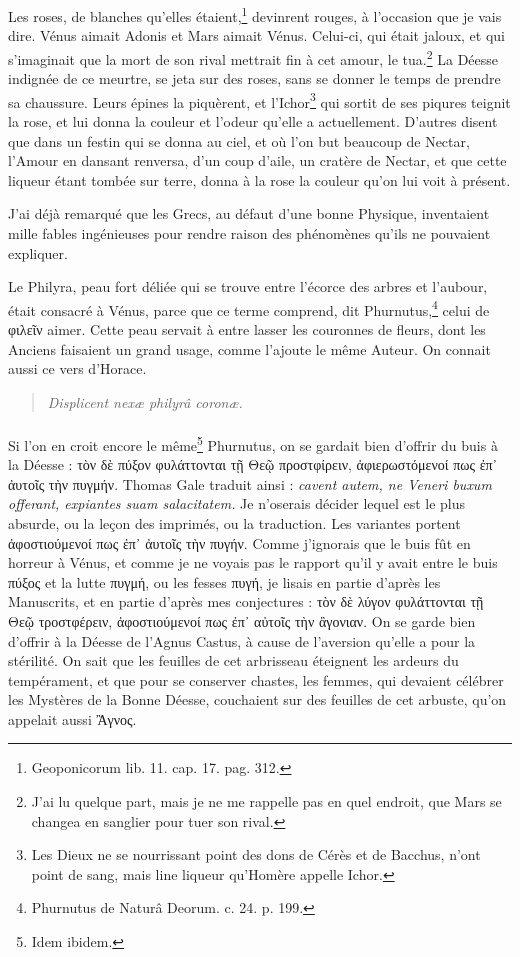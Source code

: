 \documentclass[a4paper, 18pt, oneside]{article}
\begin{document}
Les roses, de blanches qu'elles étaient,\footnote{Geoponicorum lib. 11. cap. 17. pag. 312.} devinrent rouges, à l'occasion que je vais dire. Vénus aimait Adonis et Mars aimait Vénus. Celui-ci, qui était jaloux, et qui s'imaginait que la mort de son rival mettrait fin à cet amour, le tua.\footnote{J'ai lu quelque part, mais je ne me rappelle pas en quel endroit, que Mars se changea en sanglier pour tuer son rival.} La Déesse indignée de ce meurtre, se jeta sur des roses, sans se donner le temps de prendre sa chaussure. Leurs épines la piquèrent, et l'Ichor\footnote{Les Dieux ne se nourrissant point des dons de Cérès et de Bacchus, n'ont point de sang, mais line liqueur qu'Homère appelle Ichor.} qui sortit de ses piqures teignit la rose, et lui donna la couleur et l'odeur qu'elle a actuellement. D'autres disent que dans un festin qui se donna au ciel, et où l'on but beaucoup de Nectar, l'Amour en dansant renversa, d'un coup d'aile, un cratère de Nectar, et que cette liqueur étant tombée sur terre, donna à la rose la couleur qu'on lui voit à présent.

J'ai déjà remarqué que les Grecs, au défaut d'une bonne Physique, inventaient mille fables ingénieuses pour rendre raison des phénomènes qu'ils ne pouvaient expliquer.

Le Philyra, peau fort déliée qui se trouve entre l'écorce des arbres et l'aubour, était consacré à Vénus, parce que ce terme comprend, dit Phurnutus,\footnote{Phurnutus de Naturâ Deorum. c. 24. p. 199.} celui de φιλεῖν aimer. Cette peau servait à entre lasser les couronnes de fleurs, dont les Anciens faisaient un grand usage, comme l'ajoute le même Auteur. On connait aussi ce vers d'Horace.
\begin{quotation}
\emph{Displicent nexæ philyrâ coronæ.}
\end{quotation}
\paragraph{}
Si l'on en croit encore le même\footnote{Idem ibidem.} Phurnutus, on se gardait bien d'offrir du buis à la Déesse : τὸν δὲ πύξον φυλάττονται τῇ Θεῷ προστφίρειν, ἀφιερωστόμενοί πως ἐπ᾽ ἀυτοῖς τὴν πυγμήν. Thomas Gale traduit ainsi : \emph{cavent autem, ne Veneri buxum offerant, expiantes suam salacitatem.} Je n'oserais décider lequel est le plus absurde, ou la leçon des imprimés, ou la traduction. Les variantes portent ἀφοστιούμενοί πως ἐπ᾿ ἀυτοῖς τὴν πυγήν. Comme j'ignorais que le buis fût en horreur à Vénus, et comme je ne voyais pas le rapport qu'il y avait entre le buis πύξος et la lutte πυγμή, ou les fesses πυγή, je lisais en partie d'après les Manuscrits, et en partie d'après mes conjectures : τὸν δὲ λύγον φυλάττονται τῇ Θεῷ τροστφέρειν, ἀφοστιούμενοί πως ἐπ᾿ αὐτοῖς τὴν ἂγονιαν. On se garde bien d'offrir à la Déesse de l'Agnus Castus, à cause de l'aversion qu'elle a pour la stérilité. On sait que les feuilles de cet arbrisseau éteignent les ardeurs du tempérament, et que pour se conserver chastes, les femmes, qui devaient célébrer les Mystères de la Bonne Déesse, couchaient sur des feuilles de cet arbuste, qu'on appelait aussi Ἂγνος.
\end{document}

